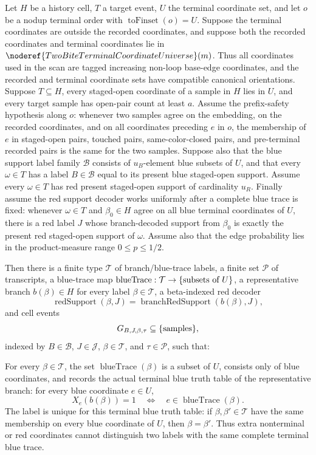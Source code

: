 \begin{helper}
Let \(H\) be a history cell, \(T\) a target event, \(U\) the terminal
coordinate set, and let \(o\) be a nodup terminal order with
\(\operatorname{toFinset}(o)=U\).  Suppose the terminal coordinates are
outside the recorded coordinates, and suppose both the recorded coordinates
and terminal coordinates lie in
\(\noderef{TwoBiteTerminalCoordinateUniverse}(m)\).  Thus all coordinates
used in the scan are tagged increasing non-loop base-edge coordinates, and
the recorded and terminal coordinate sets have compatible canonical
orientations.  Suppose \(T\subseteq H\), every
staged-open coordinate of a sample in \(H\) lies in \(U\), and every target
sample has open-pair count at least \(a\).  Assume the prefix-safety
hypothesis along \(o\): whenever two samples agree on the embedding, on the
recorded coordinates, and on all coordinates preceding \(e\) in \(o\), the
membership of \(e\) in staged-open pairs, touched pairs, same-color-closed
pairs, and pre-terminal recorded pairs is the same for the two samples.
Suppose also that the blue support label family \(\mathcal B\) consists of
\(u_B\)-element blue subsets of \(U\), and that every \(\omega\in T\) has a
label \(B\in\mathcal B\) equal to its present blue staged-open support.
Assume every \(\omega\in T\) has red present staged-open support of
cardinality \(u_R\).  Finally assume the red support decoder works uniformly
after a complete blue trace is fixed: whenever \(\omega\in T\) and
\(\beta_0\in H\) agree on all blue terminal coordinates of \(U\), there is a
red label \(J\) whose branch-decoded support from \(\beta_0\) is exactly the
present red staged-open support of \(\omega\).  Assume also that the edge
probability lies in the product-measure range \(0\le p\le1/2\).

Then there is a finite type \(\mathcal T\) of branch/blue-trace labels, a
finite set \(\mathcal P\) of transcripts, a blue-trace map
\(\operatorname{blueTrace}:\mathcal T\to\{\hbox{subsets of }U\}\), a
representative branch \(b(\beta)\in H\) for every label
\(\beta\in\mathcal T\), a beta-indexed red decoder
\[
\operatorname{redSupport}(\beta,J)
  =\operatorname{branchRedSupport}(b(\beta),J),
\]
and cell events
\[
G_{B,J,\beta,\tau}\subseteq \{\hbox{samples}\},
\]
indexed by \(B\in\mathcal B\), \(J\in\mathcal J\),
\(\beta\in\mathcal T\), and \(\tau\in\mathcal P\), such that:

For every \(\beta\in\mathcal T\), the set
\(\operatorname{blueTrace}(\beta)\) is a subset of \(U\), consists only of
blue coordinates, and records the actual terminal blue truth table of the
representative branch: for every blue coordinate \(e\in U\),
\[
X_e(b(\beta))=1
  \quad\Longleftrightarrow\quad
e\in\operatorname{blueTrace}(\beta).
\]
The label is unique for this terminal blue truth table: if
\(\beta,\beta'\in\mathcal T\) have the same membership on every blue
coordinate of \(U\), then \(\beta=\beta'\).  Thus extra nonterminal or red
coordinates cannot distinguish two labels with the same complete terminal
blue trace.


\end{helper}
